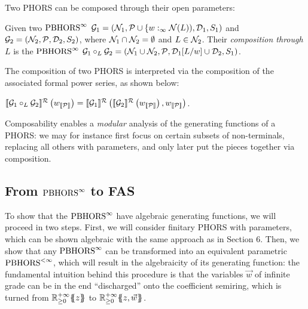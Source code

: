Two PHORS can be composed through their open parameters:
\begin{definition}
Given two $\text{PBHORS}^{\infty}$ $\mathcal{G}_1=(\mathcal{N}_1,\mathcal{P}\cup\{w:_\infty\mathcal{N}(L)),\mathcal{D}_1,S_1)$ and
$\mathcal{G}_2=(\mathcal{N}_2,\mathcal{P},\mathcal{D}_2,S_2)$, where $\mathcal{N}_1\cap\mathcal{N}_2=\emptyset$
and $L\in \mathcal{N}_2$. Their \emph{composition through $L$} is the $\text{PBHORS}^{\infty}$ $\mathcal{G}_1 \circ_L\mathcal{G}_2=(\mathcal{N}_1\cup\mathcal{N}_2, \mathcal{P}, \mathcal{D}_1[L/w]\cup\mathcal{D}_2,S_1)$.
\end{definition}


The composition of two PHORS is interpreted via the composition of the associated formal power series, as shown below:

\begin{lemma}\label{lemma:composition}
$\llbracket\mathcal{G}_1\circ_L\mathcal{G}_2\rrbracket^{\mathcal{R}}\left(w_{\llbracket\mathcal{P}\rrbracket}\right)=
\llbracket\mathcal{G}_1\rrbracket^{\mathcal{R}}\left(\llbracket\mathcal{G}_2\rrbracket^{\mathcal{R}}\left(w_{\llbracket\mathcal{P}\rrbracket}\right),w_{\llbracket\mathcal{P}\rrbracket}\right)$.
%
%
\end{lemma}

Composability enables a \emph{modular} analysis of the generating functions of a PHORS: we may for instance first focus on certain subsets of non-terminals, replacing all others with parameters, and only later put the pieces together via composition.


\subsection{From $\text{PBHORS}^{\infty}$ to FAS}



To show that the $\text{PBHORS}^{\infty}$ have algebraic generating functions, we will proceed in two steps.
First, we will consider finitary PHORS with parameters, which can be shown algebraic with the same approach as in Section 6. Then, we show that any $\text{PBHORS}^{\infty}$ can be transformed into an equivalent parametric $\text{PBHORS}^{<\infty}$, which will result in the algebraicity of its generating function: the fundamental intuition behind this procedure is that the variables $\vec w$ of infinite grade can be in the end ``discharged'' onto the coefficient semiring, which is turned from ${\mathbb{R}^{+\infty}_{\geq 0}}\{\!\!\{z\}\!\!\}$ to ${\mathbb{R}^{+\infty}_{\geq 0}}\{\!\!\{z,\vec w\}\!\!\}$.


